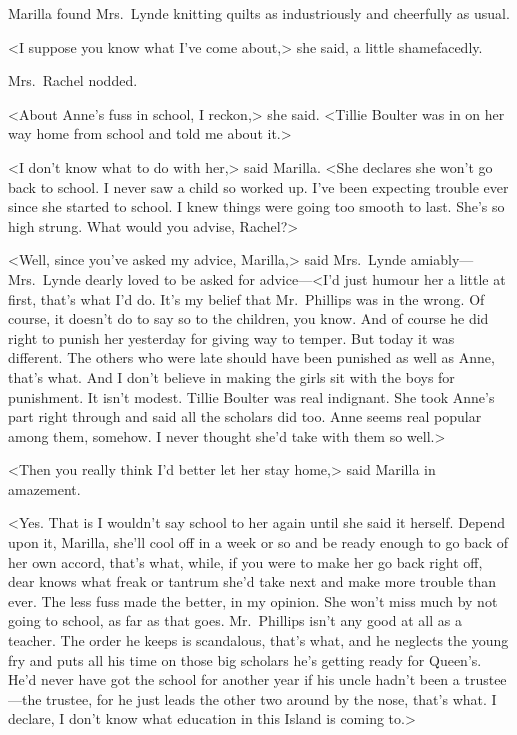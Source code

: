 Marilla found Mrs.~Lynde knitting quilts as industriously and cheerfully as usual.

<I suppose you know what I've come about,> she said, a little shamefacedly.

Mrs.~Rachel nodded.

<About Anne's fuss in school, I reckon,> she said. <Tillie Boulter was in on her way home from school and told me about it.>

<I don't know what to do with her,> said Marilla. <She declares she won't go back to school. I never saw a child so worked up. I've been expecting trouble ever since she started to school. I knew things were going too smooth to last. She's so high strung. What would you advise, Rachel?>

<Well, since you've asked my advice, Marilla,> said Mrs.~Lynde amiably—Mrs.~Lynde dearly loved to be asked for advice—<I'd just humour her a little at first, that's what I'd do. It's my belief that Mr.~Phillips was in the wrong. Of course, it doesn't do to say so to the children, you know. And of course he did right to punish her yesterday for giving way to temper. But today it was different. The others who were late should have been punished as well as Anne, that's what. And I don't believe in making the girls sit with the boys for punishment. It isn't modest. Tillie Boulter was real indignant. She took Anne's part right through and said all the scholars did too. Anne seems real popular among them, somehow. I never thought she'd take with them so well.>

<Then you really think I'd better let her stay home,> said Marilla in amazement.

<Yes. That is I wouldn't say school to her again until she said it herself. Depend upon it, Marilla, she'll cool off in a week or so and be ready enough to go back of her own accord, that's what, while, if you were to make her go back right off, dear knows what freak or tantrum she'd take next and make more trouble than ever. The less fuss made the better, in my opinion. She won't miss much by not going to school, as far as that goes. Mr.~Phillips isn't any good at all as a teacher. The order he keeps is scandalous, that's what, and he neglects the young fry and puts all his time on those big scholars he's getting ready for Queen's. He'd never have got the school for another year if his uncle hadn't been a trustee—the trustee, for he just leads the other two around by the nose, that's what. I declare, I don't know what education in this Island is coming to.>

